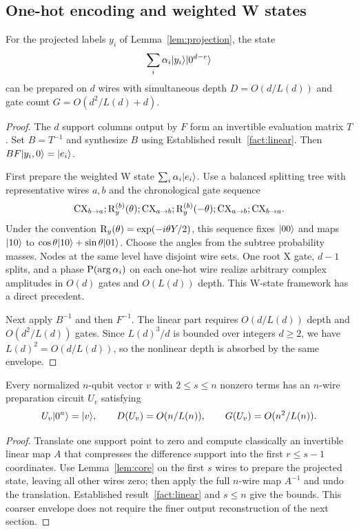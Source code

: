 \subsection{One-hot encoding and weighted W states}
\begin{lemma}\label{lem:core}
For the projected labels $y_i$ of Lemma~\ref{lem:projection}, the state
\[
\sum_i\alpha_i\lvert y_i\rangle\lvert 0^{d-r}\rangle
\]
can be prepared on $d$ wires with simultaneous depth $D=O(d/L(d))$ and gate count $G=O(d^2/L(d)+d)$.
\end{lemma}
\begin{proof}
The $d$ support columns output by $F$ form an invertible evaluation matrix $T$. Set $B=T^{-1}$ and synthesize $B$ using Established result~\ref{fact:linear}. Then $BF\lvert y_i,0\rangle=\lvert e_i\rangle$.

First prepare the weighted W state $\sum_i\alpha_i\lvert e_i\rangle$. Use a balanced splitting tree with representative wires $a,b$ and the chronological gate sequence
\begin{equation}\label{eq:wsplit}
\mathrm{CX}_{b\to a};\mathrm{R}_y^{(b)}(\theta);\mathrm{CX}_{a\to b};\mathrm{R}_y^{(b)}(-\theta);
\mathrm{CX}_{a\to b};\mathrm{CX}_{b\to a}.
\end{equation}
Under the convention $\mathrm{R}_y(\theta)=\exp(-i\theta Y/2)$, this sequence fixes $\lvert 00\rangle$ and maps $\lvert 10\rangle$ to $\cos\theta\lvert 10\rangle+\sin\theta\lvert 01\rangle$. Choose the angles from the subtree probability masses. Nodes at the same level have disjoint wire sets. One root X gate, $d-1$ splits, and a phase $\mathrm{P}(\arg\alpha_i)$ on each one-hot wire realize arbitrary complex amplitudes in $O(d)$ gates and $O(L(d))$ depth. This W-state framework has a direct precedent\cite{vilmart2026}.

Next apply $B^{-1}$ and then $F^{-1}$. The linear part requires $O(d/L(d))$ depth and $O(d^2/L(d))$ gates. Since $L(d)^3/d$ is bounded over integers $d\ge2$, we have $L(d)^2=O(d/L(d))$, so the nonlinear depth is absorbed by the same envelope.
\end{proof}

\begin{corollary}\label{cor:envelope}
Every normalized $n$-qubit vector $v$ with $2\le s\le n$ nonzero terms has an $n$-wire preparation circuit $U_v$ satisfying
\begin{equation}\label{eq:envelope}
U_v\lvert 0^n\rangle=\lvert v\rangle,\qquad
D(U_v)=O(n/L(n)),\qquad G(U_v)=O(n^2/L(n)).
\end{equation}
\end{corollary}
\begin{proof}
Translate one support point to zero and compute classically an invertible linear map $A$ that compresses the difference support into the first $r\le s-1$ coordinates. Use Lemma~\ref{lem:core} on the first $s$ wires to prepare the projected state, leaving all other wires zero; then apply the full $n$-wire map $A^{-1}$ and undo the translation. Established result~\ref{fact:linear} and $s\le n$ give the bounds. This coarser envelope does not require the finer output reconstruction of the next section.
\end{proof}
